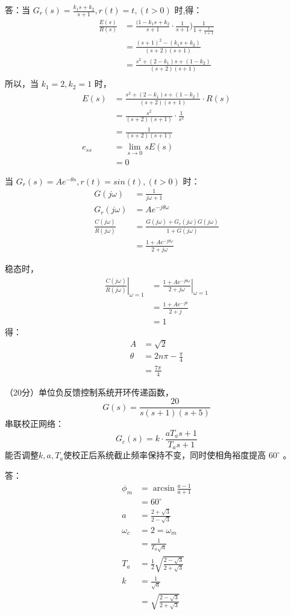 \onlyanswer
{
	答：当 $G_r(s)=\frac{k_1 s+k_2}{s+1},r(t)=t,(t>0)$ 时,得：
	\begin{align*}
	\frac{E(s)}{R(s)} &= \frac{(1-k_1s+k_2}{s+1}\cdot\frac{1}{s+1})\frac{1}{1+\frac{1}{s+1}} \\
	&=\frac{(s+1)^2-(k_1s+k_2)}{(s+2)(s+1)} \\
	&=\frac{s^2+(2-k_1)s+(1-k_2)}{(s+2)(s+1)} \\
	\end{align*}
	所以，当 $k_1=2,k_2=1$ 时，
	\begin{align*}
	E(s) &=\frac{s^2+(2-k_1)s+(1-k_2)}{(s+2)(s+1)}\cdot R(s) \\
	&=\frac{s^2}{(s+2)(s+1)}\cdot \frac{1}{s^2} \\
	&=\frac{1}{(s+2)(s+1)} \\
	e_{ss} &= \lim_{s\rightarrow 0} sE(s) \\
	&= 0
	\end{align*}
	
	当 $G_r(s)=Ae^{-\theta s},r(t)=sin(t),(t>0)$ 时：
	\begin{align*}
	G(j\omega) &=\frac{1}{j\omega+1} \\
	G_r(j\omega) &=Ae^{-j\theta\omega} \\
	\frac{C(j\omega)}{R(j\omega)} &= \frac{G(j\omega)+G_r(j\omega)G(j\omega)}{1+G(j\omega)} \\
	&=\frac{1+Ae^{-j\theta\omega}}{2+j\omega}
	\end{align*}
	
	稳态时，
	\begin{align*}
	\left.\frac{C(j\omega)}{R(j\omega)}\right|_{\omega=1} &=\left.\frac{1+Ae^{-j\theta\omega}}{2+j\omega}\right|_{\omega=1} \\
	&=\frac{1+Ae^{-j\theta}}{2+j} \\
	&=1 
	\end{align*}
	得：
	\begin{align*}
	A &=\sqrt{2} \\
	\theta &=2n\pi-\frac{\pi}{4}\\
	&=\frac{7\pi}{4}
	\end{align*}
}

\onlytest{\newpage}

\question（20分）单位负反馈控制系统开环传递函数，
$$G(s)=\frac{20}{s(s+1)(s+5)}$$
串联校正网络：
$$G_c(s)=k\cdot\frac{aT_a s+1}{T_a s+1}$$
能否调整$k,a,T_a$使校正后系统截止频率保持不变，同时使相角裕度提高 $60^\circ$ 。

\onlyanswer
{
	答：
	\begin{align*}
	\phi_m &=\arcsin\frac{a-1}{a+1}\\
	&= 60^\circ \\
	a &=\frac{2+\sqrt{3}}{2-\sqrt{3}}\\
	\omega_c &=2=\omega_m\\
	&=\frac{1}{T_a\sqrt{a}}\\
	T_a &=\frac{1}{2}\sqrt{\frac{2-\sqrt{3}}{2+\sqrt{3}}}\\
	k &=\frac{1}{\sqrt{a}}\\
	&=\sqrt{\frac{2-\sqrt{3}}{2+\sqrt{3}}}
	\end{align*}
}



